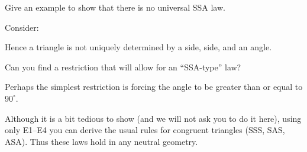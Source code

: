 \documentclass[handout]{ximera}
\begin{document}
\begin{question}
Give an example to show that there is no universal SSA law.
\begin{solution}
\begin{freeResponse}
Consider:
\begin{image}
\end{image}
Hence a triangle is not uniquely determined by a side, side, and an angle. 
\end{freeResponse}
\end{solution}
Can you find a restriction that will allow for an ``SSA-type'' law?
\begin{solution}
Perhaps the simplest restriction is forcing the angle to be greater
than or equal to $90^\circ$.
\end{solution}
\end{question}

Although it is a bit tedious to show (and we will not ask you to do it
here), using only E1--E4 you can derive the usual rules for congruent
triangles (SSS, SAS, ASA). Thus these laws hold in any neutral
geometry.
\end{document}
